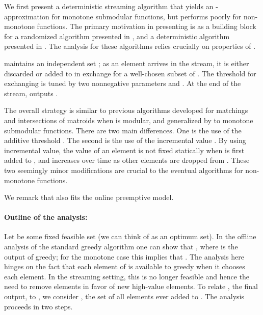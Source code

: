 \documentclass[oneside,letterpaper]{scrartcl} \usepackage{macros}
\begin{document}
We first present a deterministic streaming algorithm
 that yields an
-{\allowbreak}approximation for monotone submodular
functions, but performs poorly for non-monotone functions. The primary
motivation in presenting  is as a building
block for a randomized algorithm 
presented in , and a
deterministic algorithm  presented
in . The analysis for these
algorithms relies crucially on properties of
.

 maintains an independent set ; as an element arrives in the stream, it is either
discarded or added to  in exchange for a well-chosen subset of .
The threshold for exchanging is tuned by two nonnegative parameters
 and .  At the end of the stream,
 outputs .

The overall strategy is similar to previous algorithms developed for
matchings \cite{fkmsz-gpssm-05,m-fgmds-05} and intersections of
matroids \cite{abv-11} when  is modular, and generalized by
\cite{ck-smms-14} to monotone submodular functions.  There are two
main differences. One is the use of the additive threshold
. The second is the use of the incremental value . By
using incremental value, the value of an element  is not
fixed statically when  is first added to , and increases over
time as other elements are dropped from . These two seemingly minor
modifications are crucial to the eventual algorithms for non-monotone
functions.



We remark that  also fits the online
preemptive model.


\newcommand{\replacement}{e(\deleted)} 

\paragraph{Outline of the analysis:} Let  be some
fixed feasible set (we can think of  as an optimum set).  In the
offline analysis of the standard greedy algorithm one can show that
, where  is the output of greedy; for
the monotone case this implies that .  The
analysis here hinges on the fact that each element of 
is available to greedy when it chooses each element.  In the streaming
setting, this is no longer feasible and hence the need to remove
elements in favor of new high-value elements.  To relate ,
the final output, to , we consider , the set of all elements
ever added to . The analysis proceeds in two steps.
\end{document}
